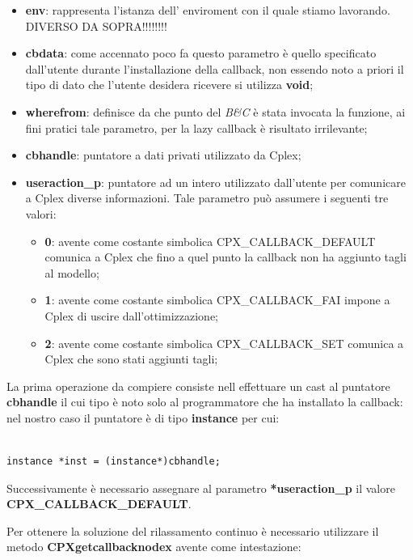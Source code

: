 \documentclass[11pt]{article}
\begin{document}
\begin{itemize}
    \item \textbf{env}: rappresenta l’istanza dell’ enviroment con il quale stiamo lavorando. DIVERSO DA SOPRA!!!!!!!!
    \item \textbf{cbdata}: come accennato poco fa questo parametro è quello specificato dall'utente durante l'installazione della callback, non essendo noto a priori il tipo di dato che l'utente desidera ricevere si utilizza \textbf{void};
    \item \textbf{wherefrom}: definisce da che punto del \textit{B\&C} è stata invocata la funzione, ai fini pratici tale parametro, per la lazy callback è risultato irrilevante;
    \item \textbf{cbhandle}: puntatore a dati privati utilizzato da Cplex;
    \item \textbf{useraction\_p}: puntatore ad un intero utilizzato dall'utente per comunicare a Cplex diverse informazioni. Tale parametro può assumere i seguenti tre valori:
    \begin{itemize}
    \item \textbf{0}: avente come costante simbolica CPX\_CALLBACK\_DEFAULT comunica a Cplex che fino a quel punto la callback non ha aggiunto tagli al modello;
    \item \textbf{1}: avente come costante simbolica CPX\_CALLBACK\_FAI impone a Cplex di uscire dall'ottimizzazione;
    \item \textbf{2}: avente come costante simbolica CPX\_CALLBACK\_SET comunica a Cplex che sono stati aggiunti tagli;
    \end{itemize}

\end{itemize}

La prima operazione da compiere consiste nell effettuare un cast al puntatore \textbf{cbhandle} il cui tipo è noto solo al programmatore che ha installato la callback: nel nostro caso il puntatore è di tipo \textbf{instance} per cui:


\begin{lstlisting}

instance *inst = (instance*)cbhandle;

\end{lstlisting}

Successivamente è necessario assegnare al parametro \textbf{*useraction\_p} il valore \textbf{CPX\_CALLBACK\_DEFAULT}.

Per ottenere la soluzione del rilassamento continuo è necessario utilizzare il metodo \textbf{CPXgetcallbacknodex} avente come intestazione:
\end{document}
